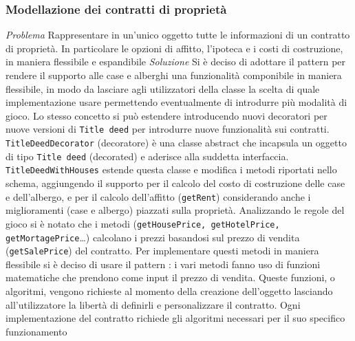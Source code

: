 \subsubsection{Modellazione dei contratti di proprietà}
\emph{Problema}\newline
Rappresentare in un'unico oggetto tutte le informazioni di un contratto di proprietà. In particolare le opzioni di affitto, l'ipoteca e i costi di costruzione, 
in maniera flessibile e espandibile\newline
\emph{Soluzione}\newline
Si è deciso di adottare il pattern  per rendere il supporto alle case e alberghi una funzionalità componibile in
maniera flessibile, in modo da lasciare agli utilizzatori della classe la scelta di quale implementazione usare permettendo eventualmente di introdurre
più modalità di gioco. Lo stesso concetto si può
estendere introducendo nuovi decoratori per nuove versioni di \texttt{Title deed} per introdurre nuove funzionalità sui contratti.\newline
\texttt{TitleDeedDecorator} (decoratore) è una classe abstract che incapsula un oggetto di tipo \texttt{Title deed} (decorated) e aderisce alla suddetta interfaccia. 
\texttt{TitleDeedWithHouses} estende questa classe e modifica i metodi riportati nello schema, aggiungendo il supporto per il calcolo del costo di costruzione delle case e dell'albergo, 
e per il calcolo dell'affitto (\texttt{getRent}) considerando anche i miglioramenti
(case e albergo) piazzati sulla proprietà.\newline
Analizzando le regole del gioco si è notato che i metodi  (\texttt{getHousePrice, getHotelPrice, getMortagePrice}\dots) 
calcolano i prezzi basandosi sul prezzo di vendita (\texttt{getSalePrice}) del contratto. Per implementare questi metodi in maniera flessibile 
si è deciso di usare il pattern :
i vari metodi  fanno uso di funzioni matematiche che prendono come input il prezzo di vendita. Queste funzioni, o algoritmi, 
vengono richieste al momento della creazione dell'oggetto lasciando all'utilizzatore la libertà di definirli e personalizzare il contratto.\newline
Ogni implementazione del contratto richiede gli algoritmi necessari per il suo specifico funzionamento\newline
